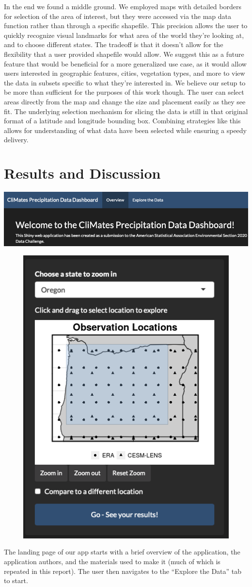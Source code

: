 \documentclass[10pt,letterpaper]{article}
\begin{document}
In the end we found a middle ground. We employed maps with detailed borders for selection of the area of interest, but they were accessed via the map data function rather than through a specific shapefile. This precision allows the user to quickly recognize visual landmarks for what area of the world they're looking at, and to choose different states. The tradeoff is that it doesn't allow for the flexibility that a user provided shapefile would allow. We
suggest this as a future feature that would be beneficial for a more generalized use case, as it would allow users interested in geographic features, cities, vegetation types, and more to view the data in subsets specific to what they're interested in. We believe our setup to be more than sufficient for the purposes of this work though. The user can select areas directly from the map and change the size and placement easily as they see fit. The underlying selection mechanism for slicing the data is still in that original format of a latitude and longitude bounding box. Combining strategies like this allows for understanding of what data have been selected while ensuring a speedy delivery.





\section*{Results and Discussion}

\begin{center}
  \includegraphics[width = .9\textwidth]{graphics/overview}
\end{center}


\begin{figure}

  \includegraphics[width=.45\textwidth]{graphics/brushedpoints}
\end{figure}
The landing page of our app starts with a brief overview of the application, the application authors, and the materials used to make it (much of which is repeated in this report). The user then navigates to the “Explore the Data” tab to start.
\end{document}

